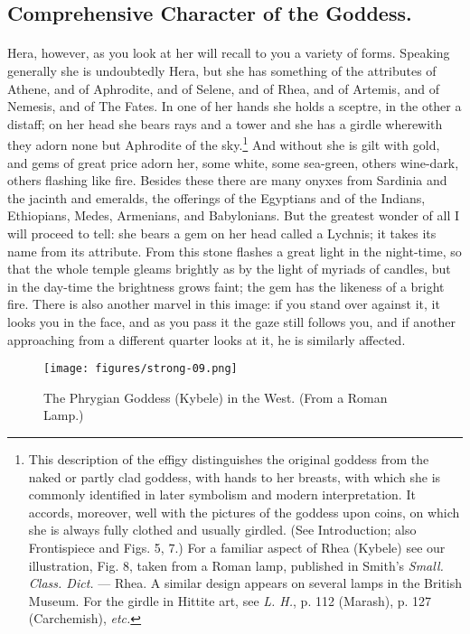 \documentclass[a4paper, 11pt, oneside, polutonikogreek, english]{article}
\begin{document}
\subsection{Comprehensive Character of the Goddess.}
\paragraph{}
Hera, however, as you look at her will recall to you a variety of forms. Speaking generally she is undoubtedly Hera, but she has something of the attributes of Athene, and of Aphrodite, and of Selene, and of Rhea, and of Artemis, and of Nemesis, and of The Fates. In one of her hands she holds a sceptre, in the other a distaff; on her head she bears rays and a tower and she has a girdle wherewith they adorn none but Aphrodite of the sky.\footnote{This description of the effigy distinguishes the original goddess from the naked or partly clad goddess, with hands to her breasts, with which she is commonly identified in later symbolism and modern interpretation. It accords, moreover, well with the pictures of the goddess upon coins, on which she is always fully clothed and usually girdled. (See Introduction; also Frontispiece and Figs. 5, 7.) For a familiar aspect of Rhea (Kybele) see our illustration, Fig. 8, taken from a Roman lamp, published in Smith's \emph{Small. Class. Dict.} --- Rhea. A similar design appears on several lamps in the British Museum. For the girdle in Hittite art, see \emph{L. H.}, p. 112 (Marash), p. 127 (Carchemish), \emph{etc.}} And without she is gilt with gold, and gems of great price adorn her, some white, some sea-green, others wine-dark, others flashing like fire. Besides these there are many onyxes from Sardinia and the jacinth and emeralds, the offerings of the Egyptians and of the Indians, Ethiopians, Medes, Armenians, and Babylonians. But the greatest wonder of all I will proceed to tell: she bears a gem on her head called a Lychnis; it takes its name from its attribute. From this stone flashes a great light in the night-time, so that the whole temple gleams brightly as by the light of myriads of candles, but in the day-time the brightness grows faint; the gem has the likeness of a bright fire. There is also another marvel in this image: if you stand over against it, it looks you in the face, and as you pass it the gaze still follows you, and if another approaching from a different quarter looks at it, he is similarly affected.

\begin{figure}[H]
\centering
\texttt{[image: figures/strong-09.png]}
\caption{The Phrygian Goddess (Kybele) in the West. (From a Roman Lamp.)}
\end{figure}
\end{document}
